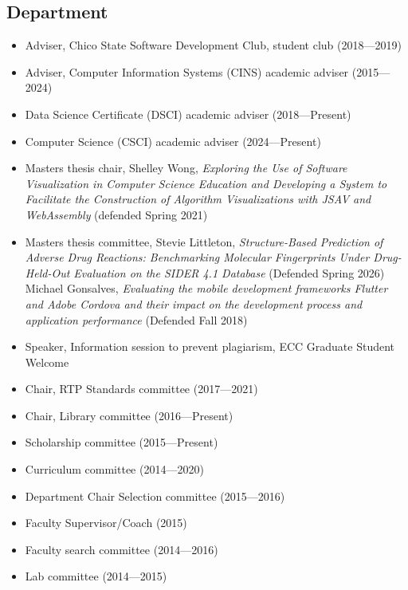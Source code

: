 \documentclass[10pt,letterpaper]{article}
\begin{document}
{\subsection*{Department}
\begin{itemize}[leftmargin=1.25em]
\item Adviser, Chico State Software Development Club, student club (2018---2019)
\item Adviser, Computer Information Systems (CINS) academic adviser (2015---2024)
\item Data Science Certificate (DSCI) academic adviser (2018---Present)
\item Computer Science (CSCI) academic adviser (2024---Present)
\item Masters thesis chair, Shelley Wong, \textit{Exploring the Use of Software Visualization in Computer Science Education and Developing a System to Facilitate the Construction of Algorithm Visualizations with JSAV and WebAssembly} (defended Spring 2021)
\item Masters thesis committee, Stevie Littleton, \textit{Structure-Based Prediction of Adverse Drug Reactions: Benchmarking Molecular Fingerprints Under Drug-Held-Out Evaluation on the SIDER 4.1 Database} (Defended Spring 2026)\\
Michael Gonsalves, \textit{Evaluating the mobile development frameworks Flutter and Adobe Cordova and their impact on the development process and application performance} (Defended Fall 2018)
\item Speaker, Information session to prevent plagiarism, ECC Graduate Student Welcome
\item Chair, RTP Standards committee (2017---2021)
\item Chair, Library committee (2016---Present)
\item Scholarship committee (2015---Present)
\item Curriculum committee (2014---2020)
\item Department Chair Selection committee (2015---2016)
\item Faculty Supervisor/Coach (2015)
\item Faculty search committee (2014---2016)
\item Lab committee (2014---2015)
\end{itemize}
}
\end{document}
